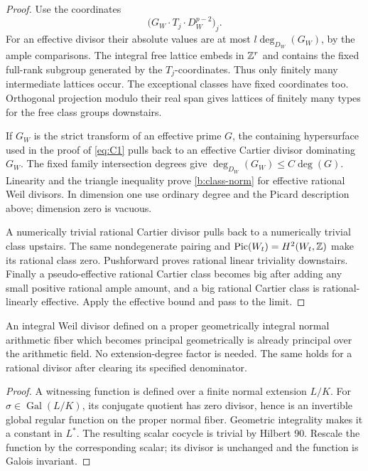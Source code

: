 \begin{proof}
Use the coordinates
\[
                  \bigl(G_W\cdot T_j\cdot D_W^{p-2}\bigr)_j.
\]
For an effective divisor their absolute values are at most
\(l\deg_{D_W}(G_W)\), by the ample comparisons.
The integral free lattice embeds in \(\mathbb Z^r\) and contains the
fixed full-rank subgroup generated by the \(T_j\)-coordinates.
Thus only finitely many intermediate lattices occur. The
exceptional classes have fixed coordinates too. Orthogonal
projection modulo their real span gives lattices of finitely
many types for the free class groups downstairs.

If \(G_W\) is the strict transform of an effective prime \(G\),
the containing hypersurface used in the proof of \eqref{eq:C1}
pulls back to an effective Cartier divisor dominating \(G_W\).
The fixed family intersection degrees give
\(\deg_{D_W}(G_W)\le C\deg(G)\).
Linearity and the triangle inequality prove \eqref{b:class-norm}
for effective rational Weil divisors. In dimension one use
ordinary degree and the Picard description above; dimension
zero is vacuous.

A numerically trivial rational Cartier divisor pulls back to
a numerically trivial class upstairs. The same nondegenerate
pairing and \(\operatorname{Pic}(W_t)=H^2(W_t,\mathbb Z)\) make its rational class zero.
Pushforward proves rational linear triviality downstairs.
Finally a pseudo-effective rational Cartier class becomes big
after adding any small positive rational ample amount, and a
big rational Cartier class is rational-linearly effective.
Apply the effective bound and pass to the limit.
\end{proof}

\begin{lemma}\label{b:principal-descent}
An integral Weil divisor defined on a proper geometrically integral
normal arithmetic fiber which becomes principal geometrically is
already principal over the arithmetic field. No extension-degree
factor is needed. The same holds for a rational divisor after
clearing its specified denominator.
\end{lemma}

\begin{proof}
A witnessing function is defined over a finite normal extension
\(L/K\). For \(\sigma\in\operatorname{Gal}(L/K)\), its conjugate
quotient has zero divisor, hence is an invertible global regular
function on the proper normal fiber. Geometric integrality makes
it a constant in \(L^*\). The resulting scalar cocycle is trivial
by Hilbert 90. Rescale the function by the corresponding scalar;
its divisor is unchanged and the function is Galois invariant.
\end{proof}

